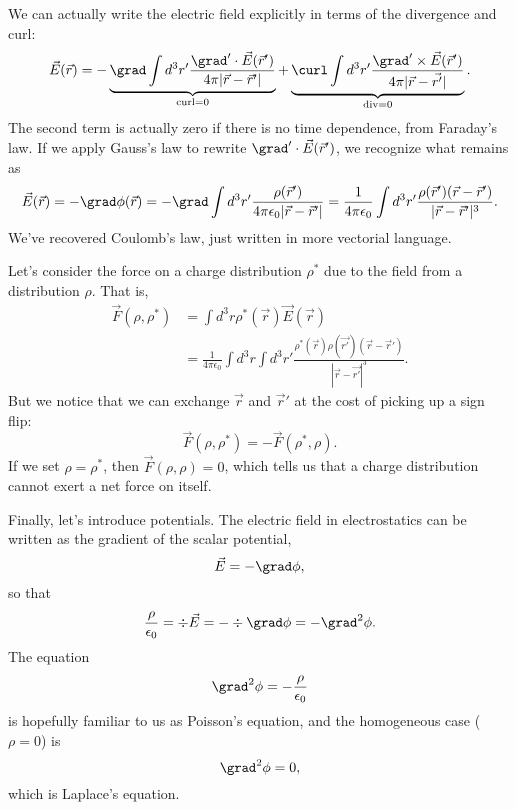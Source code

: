We can actually write the electric field explicitly in terms of the divergence and curl:
\begin{equation}
    \vec{E}(\vec{r}) = -\underbrace{\grad \int d^3 r' \frac{\grad' \cdot \vec{E}(\vec{r}')}{4\pi \abs{\vec{r}-\vec{r}'}}}_{\text{curl}=0} + \underbrace{\curl \int d^3 r' \frac{\grad'\times \vec{E}(\vec{r}')}{4\pi\abs{\vec{r}-\vec{r'}}}}_{\text{div}=0}.
\end{equation}
The second term is actually zero if there is no time dependence, from Faraday's law. If we apply Gauss's law to rewrite $\grad'\cdot \vec{E}(\vec r')$, we recognize what remains as
\begin{equation}
    \vec{E}(\vec{r}) = -\grad \phi(\vec r) = -\grad \int d^3 r' \frac{\rho(\vec{r}')}{4\pi \epsilon_0 \abs{\vec{r} - \vec{r}'}} = \frac{1}{4\pi \epsilon_0} \int d^3 r' \frac{\rho(\vec{r}')(\vec{r}-\vec{r}')}{\abs{\vec{r} - \vec{r}'}^3}.
\end{equation}
We've recovered Coulomb's law, just written in more vectorial language.

Let's consider the force on a charge distribution $\rho^*$ due to the field from a distribution $\rho$. That is,
\begin{align}
    \vec{F}(\rho,\rho^*) &= \int d^3 r \rho^*(\vec r) \vec{E}(\vec{r})\\
        &= \frac{1}{4\pi \epsilon_0} \int d^3 r \int d^3 r' \frac{\rho^*(\vec{r}) \rho(\vec{r'}) (\vec r-\vec{r}')}{|\vec{r} - \vec{r'}|^3}.
\end{align}
But we notice that we can exchange $\vec{r}$ and $\vec{r}'$ at the cost of picking up a sign flip:
\begin{equation}
    \vec{F}(\rho,\rho^*) = -\vec{F}(\rho^*,\rho).
\end{equation}
If we set $\rho=\rho^*$, then $\vec{F}(\rho,\rho)=0$, which tells us that a charge distribution cannot exert a net force on itself.

Finally, let's introduce potentials. The electric field in electrostatics can be written as the gradient of the scalar potential,
\begin{equation}
    \vec{E} = -\grad \phi,
\end{equation}
so that
\begin{equation}
     \frac{\rho}{\epsilon_0} = \div \vec{E} = - \div \grad \phi = -\grad^2 \phi.
\end{equation}
The equation
\begin{equation}
    \grad^2 \phi = -\frac{\rho}{\epsilon_0}
\end{equation}
is hopefully familiar to us as Poisson's equation, and the homogeneous case ($\rho=0$) is
\begin{equation}
    \grad^2 \phi = 0,
\end{equation}
which is Laplace's equation.